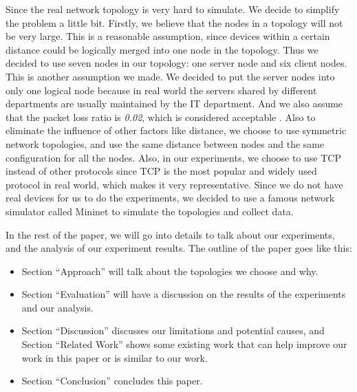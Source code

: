 Since the real network topology is very hard to simulate. 
We decide to simplify the problem a little bit. 
Firstly, we believe that the nodes in a topology will not be very large. 
This is a reasonable assumption, since devices within a certain distance 
could be logically merged into one node in the topology. 
Thus we decided to use seven nodes in our topology: 
one server node and six client nodes. This is another assumption we made. 
We decided to put the server nodes into only one logical node 
because in real world the servers shared by different departments are usually 
maintained by the IT department. And we also assume that 
the packet loss ratio is \textit{0.02}, which is considered acceptable \cite{PacketLoss:wiki}. 
Also to eliminate the influence of other factors like distance, 
we choose to use symmetric network topologies, 
and use the same distance between nodes and the same configuration for all the nodes.
Also, in our experiments, we choose to use TCP instead of other protocols since TCP is the most 
popular and widely used protocol in real world, which makes it very representative. Since we do not 
have real devices for us to do the experiments, we decided to use a famous network simulator called
Mininet\cite{Mininet:official} to simulate the topologies and collect data.

In the rest of the paper, we will go into details to talk about our experiments, and the analysis 
of our experiment results. The outline of the paper goes like this:
\begin{itemize}
    \item Section ``Approach'' will talk about the topologies we choose and why.
    \item Section ``Evaluation'' will have a discussion on the results of the experiments and our analysis.
	\item Section ``Discussion'' discusses our limitations and potential
	causes, and Section ``Related Work'' shows some existing work that 
	can help improve our work in this paper or is similar to our work.
    \item Section ``Conclusion'' concludes this paper.
\end{itemize}

